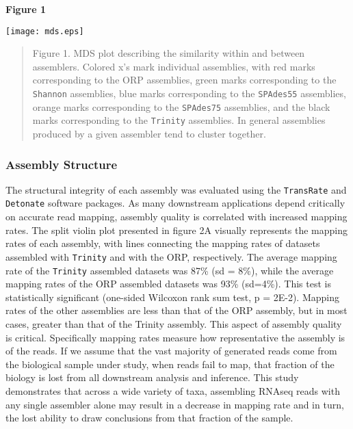\documentclass[10pt,letterpaper]{article}
\begin{document}
\newpage
\textbf{\hypertarget{Figure 1}{Figure 1}} \\
\centerline{\texttt{[image: mds.eps]}}
\begin{quote}
\small{Figure 1. MDS plot describing the similarity within and between assemblers. Colored x's mark individual assemblies, with red marks corresponding to the ORP assemblies, green marks corresponding to the \texttt{Shannon} assemblies, blue marks corresponding to the \texttt{SPAdes55} assemblies, orange marks corresponding to the \texttt{SPAdes75} assemblies, and the black marks corresponding to the \texttt{Trinity} assemblies. In general assemblies produced by a given assembler tend to cluster together.}
\end{quote} 

  

\subsubsection{Assembly Structure}

The structural integrity of each assembly was evaluated using the \texttt{TransRate} and \texttt{Detonate} software packages. As many downstream applications depend critically on accurate read mapping, assembly quality is correlated with increased mapping rates. The split violin plot presented in figure 2A visually represents the mapping rates of each assembly, with lines connecting the mapping rates of datasets assembled with \texttt{Trinity} and with the ORP, respectively. The average mapping rate of the \texttt{Trinity} assembled datasets was 87\% (sd = 8\%), while the average mapping rates of the ORP assembled datasets was 93\% (sd=4\%). This test is statistically significant (one-sided Wilcoxon rank sum test, p = 2E-2). Mapping rates of the other assemblies are less than that of the ORP assembly, but in most cases, greater than that of the Trinity assembly. This aspect of assembly quality is critical. Specifically mapping rates measure how representative the assembly is of the reads. If we assume that the vast majority of generated reads come from the biological sample under study, when reads fail to map, that fraction of the biology is lost from all downstream analysis and inference. This study demonstrates that across a wide variety of taxa, assembling RNAseq reads with any single assembler alone may result in a decrease in mapping rate and in turn, the lost ability to draw conclusions from that fraction of the sample. 
\end{document}
